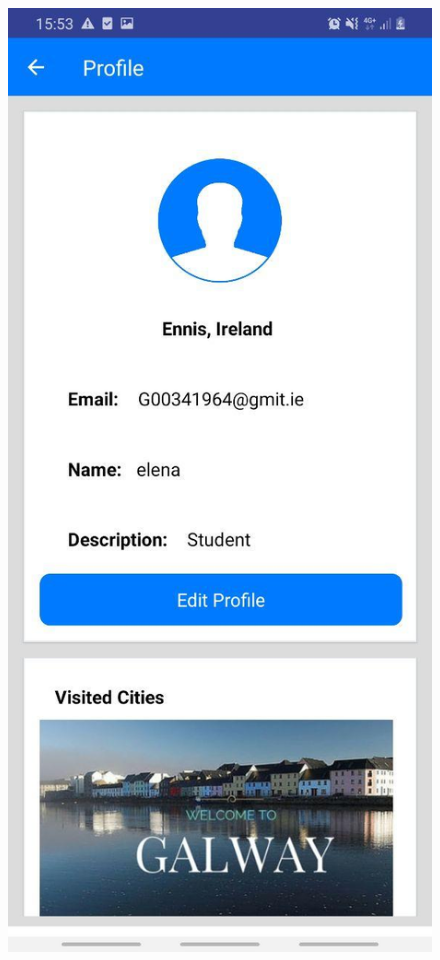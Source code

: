 \begin{figure}[h!]
\begin{minipage}[t]{0.48\textwidth}
\includegraphics[width=\linewidth,keepaspectratio=true]{img/profile1.jpg}

\end{minipage}
\end{figure}
